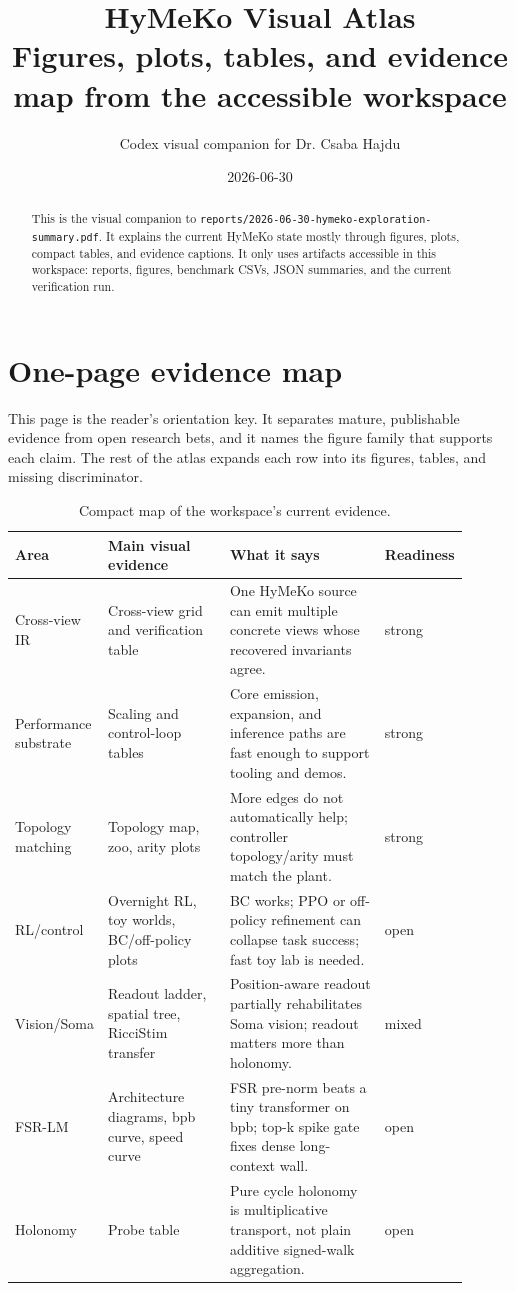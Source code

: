 \documentclass[10pt]{article}
\title{\textbf{HyMeKo Visual Atlas}\\[2pt]
\large Figures, plots, tables, and evidence map from the accessible workspace}
\author{Codex visual companion for Dr. Csaba Hajdu}
\date{2026-06-30}
\newcommand{\taggood}{\textcolor{green!45!black}{strong}}
\newcommand{\tagmixed}{\textcolor{orange!70!black}{mixed}}
\newcommand{\tagopen}{\textcolor{blue!60!black}{open}}
\begin{document}
\maketitle

\begin{abstract}
\noindent This is the visual companion to
\nolinkurl{reports/2026-06-30-hymeko-exploration-summary.pdf}. It explains the
current HyMeKo state mostly through figures, plots, compact tables, and
evidence captions. It only uses artifacts accessible in this workspace: reports,
figures, benchmark CSVs, JSON summaries, and the current verification run.
\end{abstract}

\section{One-page evidence map}

This page is the reader's orientation key. It separates mature, publishable
evidence from open research bets, and it names the figure family that supports
each claim. The rest of the atlas expands each row into its figures, tables,
and missing discriminator.

\begin{table}[!htbp]\centering\small
\begin{tabular}{p{0.15\linewidth}p{0.28\linewidth}p{0.36\linewidth}p{0.11\linewidth}}
\toprule
Area & Main visual evidence & What it says & Readiness \\
\midrule
Cross-view IR & Cross-view grid and verification table & One HyMeKo source can
emit multiple concrete views whose recovered invariants agree. & \taggood \\
Performance substrate & Scaling and control-loop tables & Core emission,
expansion, and inference paths are fast enough to support tooling and demos. & \taggood \\
Topology matching & Topology map, zoo, arity plots & More edges do not
automatically help; controller topology/arity must match the plant. & \taggood \\
RL/control & Overnight RL, toy worlds, BC/off-policy plots & BC works; PPO or
off-policy refinement can collapse task success; fast toy lab is needed. & \tagopen \\
Vision/Soma & Readout ladder, spatial tree, RicciStim transfer & Position-aware
readout partially rehabilitates Soma vision; readout matters more than holonomy. & \tagmixed \\
FSR-LM & Architecture diagrams, bpb curve, speed curve & FSR pre-norm beats a
tiny transformer on bpb; top-k spike gate fixes dense long-context wall. & \tagopen \\
Holonomy & Probe table & Pure cycle holonomy is multiplicative transport, not
plain additive signed-walk aggregation. & \tagopen \\
\bottomrule
\end{tabular}
\caption{Compact map of the workspace's current evidence.}
\end{table}
\end{document}
